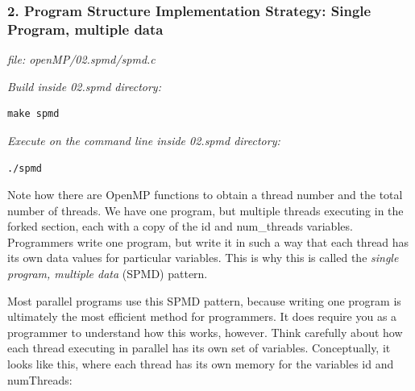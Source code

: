 \documentclass[letterpaper,10pt,openany,oneside]{sphinxmanual}
\begin{document}
\subsubsection{2. Program Structure Implementation Strategy: Single Program, multiple data}
\label{SharedMemory/ProgStructure_Barrier:program-structure-implementation-strategy-single-program-multiple-data}
\emph{file: openMP/02.spmd/spmd.c}

\emph{Build inside 02.spmd directory:}

\begin{Verbatim}[commandchars=\\\{\}]
make spmd
\end{Verbatim}

\emph{Execute on the command line inside 02.spmd directory:}

\begin{Verbatim}[commandchars=\\\{\}]
./spmd
\end{Verbatim}

Note how there are OpenMP functions to
obtain a thread number and the total number of threads.
We have one program, but multiple threads executing in the forked section,
each with a copy of the id and num\_threads variables.
Programmers write one program, but write it in such a way that
each thread has its own data values for particular variables.
This is why this is called the \emph{single program, multiple data} (SPMD) pattern.

Most parallel programs use this SPMD pattern, because writing one program
is ultimately the most efficient method for programmers.  It does require you
as a programmer to understand how this works, however.  Think carefully about
how each thread executing in parallel has its own set of variables.  Conceptually,
it looks like this, where each thread has its own memory for the variables id and numThreads:
\end{document}
